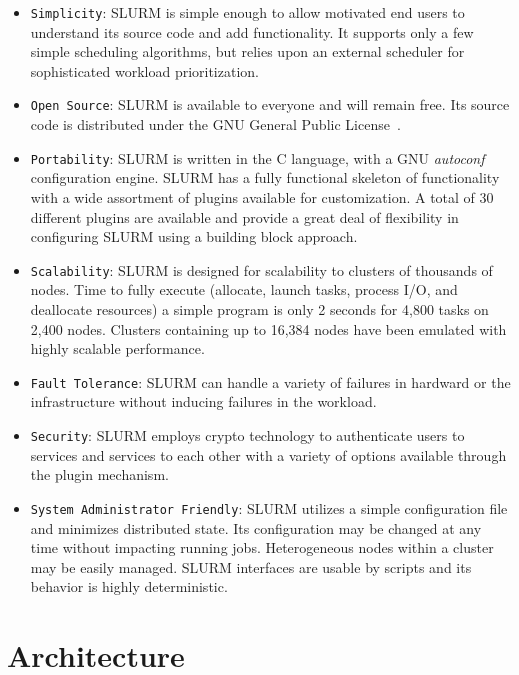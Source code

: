 \documentclass[10pt,twocolumn,times]{../common/llncs}
\begin{document}
{\begin{itemize}
\item {\tt Simplicity}: SLURM is simple enough to allow motivated 
end users to understand its source code and add functionality. 
It supports only a few simple scheduling algorithms, 
but relies upon an external scheduler for sophisticated
workload prioritization.

\item {\tt Open Source}: SLURM is available to everyone and 
will remain free.
Its source code is distributed under the GNU General Public
License~\cite{GPL2002}.

\item {\tt Portability}: SLURM is written in the C language, 
with a GNU {\em autoconf} configuration engine.
SLURM has a fully functional skeleton of functionality with a
wide assortment of plugins available for customization. 
A total of 30 different plugins are available and provide a 
great deal of flexibility in configuring SLURM using a 
building block approach.

\item {\tt Scalability}: SLURM is designed for scalability to clusters 
of thousands of nodes. Time to fully execute (allocate, launch
tasks, process I/O, and deallocate resources) a simple program
is only 2 seconds for 4,800 tasks on 2,400 nodes. Clusters 
containing up to 16,384 nodes have been emulated with highly 
scalable performance. 

\item {\tt Fault Tolerance}: SLURM can handle a variety of failures
in hardward or the infrastructure without inducing failures in 
the workload.

\item {\tt Security}: SLURM employs crypto technology to authenticate
users to services and services to each other with a variety of options
available through the plugin mechanism.  

\item {\tt System Administrator Friendly}: SLURM utilizes
a simple configuration file and minimizes distributed state.
Its configuration may be changed at any time without impacting running
jobs.  Heterogeneous nodes within a cluster may be easily managed.  SLURM
interfaces are usable by scripts and its behavior is highly deterministic.

\end{itemize}

\section{Architecture}

}
\end{document}
